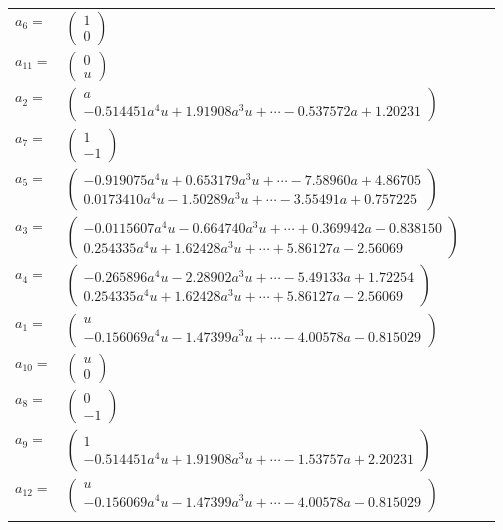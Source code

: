 \documentclass[1p]{elsarticle_modified}
\theoremstyle{definition}
\begin{document}
\begin{tabular}{m{7pt} m{180pt} m{7pt} m{180pt} }
\flushright $a_{6}=$&$\begin{pmatrix}1\\0\end{pmatrix}$ \\
\flushright $a_{11}=$&$\begin{pmatrix}0\\u\end{pmatrix}$ \\
\flushright $a_{2}=$&$\begin{pmatrix}a\\-0.514451 a^{4} u+1.91908 a^{3} u+\cdots-0.537572 a+1.20231\end{pmatrix}$ \\
\flushright $a_{7}=$&$\begin{pmatrix}1\\-1\end{pmatrix}$ \\
\flushright $a_{5}=$&$\begin{pmatrix}-0.919075 a^{4} u+0.653179 a^{3} u+\cdots-7.58960 a+4.86705\\0.0173410 a^{4} u-1.50289 a^{3} u+\cdots-3.55491 a+0.757225\end{pmatrix}$ \\
\flushright $a_{3}=$&$\begin{pmatrix}-0.0115607 a^{4} u-0.664740 a^{3} u+\cdots+0.369942 a-0.838150\\0.254335 a^{4} u+1.62428 a^{3} u+\cdots+5.86127 a-2.56069\end{pmatrix}$ \\
\flushright $a_{4}=$&$\begin{pmatrix}-0.265896 a^{4} u-2.28902 a^{3} u+\cdots-5.49133 a+1.72254\\0.254335 a^{4} u+1.62428 a^{3} u+\cdots+5.86127 a-2.56069\end{pmatrix}$ \\
\flushright $a_{1}=$&$\begin{pmatrix}u\\-0.156069 a^{4} u-1.47399 a^{3} u+\cdots-4.00578 a-0.815029\end{pmatrix}$ \\
\flushright $a_{10}=$&$\begin{pmatrix}u\\0\end{pmatrix}$ \\
\flushright $a_{8}=$&$\begin{pmatrix}0\\-1\end{pmatrix}$ \\
\flushright $a_{9}=$&$\begin{pmatrix}1\\-0.514451 a^{4} u+1.91908 a^{3} u+\cdots-1.53757 a+2.20231\end{pmatrix}$ \\
\flushright $a_{12}=$&$\begin{pmatrix}u\\-0.156069 a^{4} u-1.47399 a^{3} u+\cdots-4.00578 a-0.815029\end{pmatrix}$\\&\end{tabular}
\end{document}
